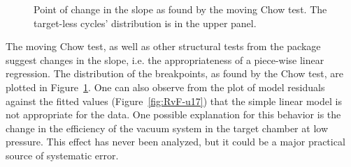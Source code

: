 \documentclass{article}
\begin{document}
\begin{figure}[h]
\begin{minipage}{.5\textwidth}
		\caption{Point of change in the slope as found by the moving Chow test. The target-less cycles' distribution is in the upper panel.\label{FStat_BP_dens}}
	\end{minipage}
\end{figure}

The moving Chow test, as well as other structural tests from the package~\cite{RStrucchange} suggest changes in the slope, i.e. the appropriateness of a piece-wise linear regression. The distribution of the breakpoints, as found by the Chow test, are plotted in Figure~\ref{FStat_BP_dens}. One can also observe from the plot of model residuals against the fitted values (Figure~\ref{fig:RvF-u17}) that the simple linear model is not appropriate for the data. One possible explanation for this behavior is the change in the efficiency of the vacuum system in the target chamber at low pressure. This effect has never been analyzed, but it could be a major practical source of systematic error.
\end{document}
